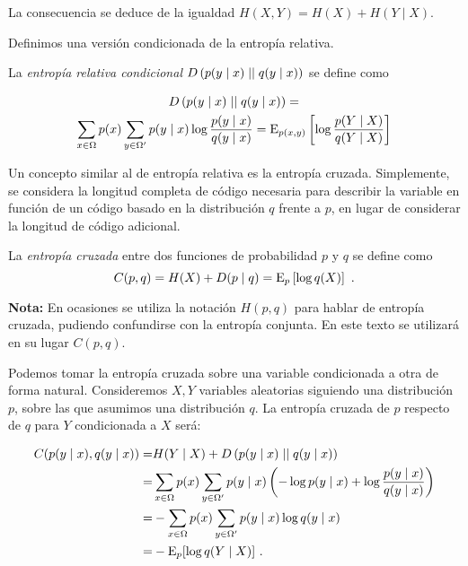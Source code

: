 La consecuencia se deduce de la igualdad \(H(X,Y)=H(X)+H(Y\mid X)\).
\proofe

\theoe

Definimos una versión condicionada de la entropía relativa.

La \emph{entropía relativa condicional}
\(D\left(p(y\mid x)\mid\mid q(y\mid x)\right)\) se define como

\begin{gather*}D\left(p(y\mid x)\mid\mid q(y\mid x)\right)=\\\sum_{x\in\Omega}p(x)\sum_{y\in\Omega'}p(y\mid x)\log\frac{p(y\mid x)}{q(y\mid x)}=\mathrm{E}_{p(x,y)}\left[\log\frac{p(Y\mid X)}{q(Y\mid X)}\right]
\end{gather*}


Un concepto similar al de entropía relativa es la entropía cruzada.
Simplemente, se considera la longitud completa de código necesaria para describir la variable en función de un código basado en la distribución $q$ frente a $p$, en lugar de considerar la longitud de código adicional.

La \emph{entropía cruzada} entre dos funciones de probabilidad \(p\) y
\(q\) se define como
\[C(p, q)=H(X) + D(p\mid q)=\mathrm{E}_p\left[\log q(X)\right]~.\]

\textbf{Nota:} En ocasiones se utiliza la notación \(H(p,q)\) para
hablar de entropía cruzada, pudiendo confundirse con la entropía
conjunta. En este texto se utilizará en su lugar \(C(p,q)\). 

\remb
Podemos tomar la entropía cruzada sobre una variable condicionada a otra
de forma natural. Consideremos \(X,Y\) variables aleatorias siguiendo
una distribución \(p\), sobre las que asumimos una distribución \(q\).
La entropía cruzada de \(p\) respecto de \(q\) para \(Y\) condicionada a
\(X\) será:

\begin{align*}
  C(p(y\mid x),q(y \mid x))=&H(Y\mid X) + D\left(p(y\mid x)\mid\mid q(y\mid x)\right)\\
                =&\sum_{x\in\Omega}p(x)\sum_{y\in\Omega'}p(y\mid x)\left(-\log p(y\mid x)
                  +\log\frac{p(y\mid x)}{q(y\mid x)}\right)\\
                =&-\sum_{x\in\Omega}p(x)\sum_{y\in\Omega'}p(y\mid x)\log q(y\mid x)\\
                =&-\mathrm{E}_p[\log q(Y\mid X)]~.
\end{align*}

\reme

